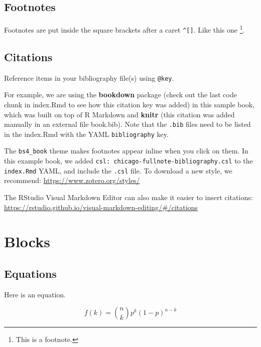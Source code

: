 \documentclass[
]{book}
\theoremstyle{definition}
\theoremstyle{definition}
\theoremstyle{definition}
\theoremstyle{definition}
\theoremstyle{remark}
\begin{document}
\hypertarget{footnotes}{%
\section{Footnotes}\label{footnotes}}

Footnotes are put inside the square brackets after a caret \texttt{\^{}{[}{]}}. Like this one \footnote{This is a footnote.}.

\hypertarget{citations}{%
\section{Citations}\label{citations}}

Reference items in your bibliography file(s) using \texttt{@key}.

For example, we are using the \textbf{bookdown} package \citep{R-bookdown} (check out the last code chunk in index.Rmd to see how this citation key was added) in this sample book, which was built on top of R Markdown and \textbf{knitr} \citep{xie2015} (this citation was added manually in an external file book.bib).
Note that the \texttt{.bib} files need to be listed in the index.Rmd with the YAML \texttt{bibliography} key.

The \texttt{bs4\_book} theme makes footnotes appear inline when you click on them. In this example book, we added \texttt{csl:\ chicago-fullnote-bibliography.csl} to the \texttt{index.Rmd} YAML, and include the \texttt{.csl} file. To download a new style, we recommend: \url{https://www.zotero.org/styles/}

The RStudio Visual Markdown Editor can also make it easier to insert citations: \url{https://rstudio.github.io/visual-markdown-editing/\#/citations}

\hypertarget{blocks}{%
\chapter{Blocks}\label{blocks}}

\hypertarget{equations}{%
\section{Equations}\label{equations}}

Here is an equation.

\begin{equation} 
  f\left(k\right) = \binom{n}{k} p^k\left(1-p\right)^{n-k}
  \label{eq:binom}
\end{equation}
\end{document}
